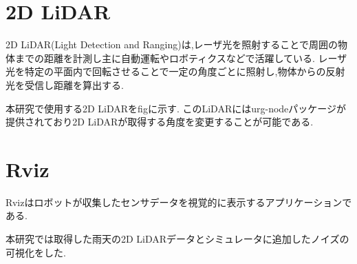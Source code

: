 \section{2D LiDAR}

2D LiDAR(Light Detection and Ranging)は,レーザ光を照射することで周囲の物体までの距離を計測し主に自動運転やロボティクスなどで活躍している.
レーザ光を特定の平面内で回転させることで一定の角度ごとに照射し,物体からの反射光を受信し距離を算出する.

本研究で使用する2D LiDARをfigに示す.
このLiDARにはurg-nodeパッケージが提供されており2D LiDARが取得する角度を変更することが可能である.

\section{Rviz}

Rvizはロボットが収集したセンサデータを視覚的に表示するアプリケーションである.

本研究では取得した雨天の2D LiDARデータとシミュレータに追加したノイズの可視化をした.